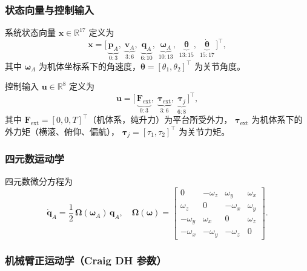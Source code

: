 \subsubsection{状态向量与控制输入}

系统状态向量 $\mathbf{x}\in\mathbb{R}^{17}$ 定义为
\begin{equation}
    \mathbf{x} = \bigl[\,
        \underbrace{\mathbf{p}_A}_{0:3},\;
        \underbrace{\mathbf{v}_A}_{3:6},\;
        \underbrace{\mathbf{q}_A}_{6:10},\;
        \underbrace{\boldsymbol{\omega}_A}_{10:13},\;
        \underbrace{\boldsymbol{\theta}}_{13:15},\;
        \underbrace{\dot{\boldsymbol{\theta}}}_{15:17}
    \,\bigr]^\top,
    \label{eq:state_vec}
\end{equation}
其中 $\boldsymbol{\omega}_A$ 为机体坐标系下的角速度，$\boldsymbol{\theta}=[\theta_1,\theta_2]^\top$ 为关节角度。

控制输入 $\mathbf{u}\in\mathbb{R}^{8}$ 定义为
\begin{equation}
    \mathbf{u} = \bigl[\,
        \underbrace{\mathbf{F}_{\mathrm{ext}}}_{0:3},\;
        \underbrace{\boldsymbol{\tau}_{\mathrm{ext}}}_{3:6},\;
        \underbrace{\boldsymbol{\tau}_j}_{6:8}
    \,\bigr]^\top,
\end{equation}
其中 $\mathbf{F}_{\mathrm{ext}}=[0,0,T]^\top$（机体系，纯升力）为平台所受外力，
$\boldsymbol{\tau}_{\mathrm{ext}}$ 为机体系下的外力矩（横滚、俯仰、偏航），
$\boldsymbol{\tau}_j=[\tau_1,\tau_2]^\top$ 为关节力矩。

\subsubsection{四元数运动学}

四元数微分方程为
\begin{equation}
    \dot{\mathbf{q}}_A = \frac{1}{2}\,\boldsymbol{\Omega}(\boldsymbol{\omega}_A)\,\mathbf{q}_A,
    \quad
    \boldsymbol{\Omega}(\boldsymbol{\omega}) =
    \begin{bmatrix}
         0          & -\omega_z  &  \omega_y  & \omega_x \\
         \omega_z   &  0         & -\omega_x  & \omega_y \\
        -\omega_y   &  \omega_x  &  0         & \omega_z \\
        -\omega_x   & -\omega_y  & -\omega_z  &  0
    \end{bmatrix}.
    \label{eq:quat_kinematics}
\end{equation}

\subsubsection{机械臂正运动学（Craig DH 参数）}

